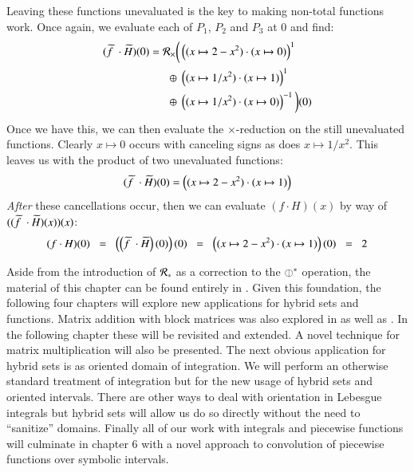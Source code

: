 Leaving these functions unevaluated is the key to making non-total functions work.
Once again, we evaluate each of $P_1$, $P_2$ and $P_3$ at 0 and find:
\begin{align*}
	(\pseudo{f\;} \cdot \,\pseudo{\!H})(0) = \mathcal{R}_\times \bigg(
				& \left( (x \mapsto 2-x^2) \cdot (x \mapsto 0) \right)^1 \notag \\
		\oplus \;& \left( (x \mapsto 1/x^2) \cdot (x \mapsto 1) \right)^1 \notag \\
		\oplus \;& \left( (x \mapsto 1/x^2) \cdot (x \mapsto 0) \right)^{-1} 
	\bigg)(0)
\end{align*}
Once we have this, we can then evaluate the $\times$-reduction on the still unevaluated functions.
Clearly $x \mapsto 0$ occurs with canceling signs as does $x \mapsto 1/x^2$.
This leaves us with the product of two unevaluated functions:
\begin{equation*}
	(\pseudo{f\;}\cdot\,\pseudo{\!H})(0) = \left((x \mapsto 2-x^2) \cdot (x \mapsto 1)\right)
\end{equation*}
\emph{After} these cancellations occur, then we can evaluate $(f \cdot H)(x)$ by way of
$((\pseudo{f\;}\cdot\,\pseudo{\!H})(x))(x)$:
\begin{align*}
	(f \cdot H)(0) 
		\;\;=\;\; \left(\left(\pseudo{f\;} \cdot \,\pseudo{\!H}\right)(0)\right)(0) 
		\;\;=\;\; \left((x \mapsto 2-x^2) \cdot (x \mapsto 1)\right)(0)
		\;\;=\;\; 2
\end{align*}


Aside from the introduction of $\R[\op]$ as a correction to the $\obar^\op$ operation, 
the material of this chapter can be found entirely in \cite{carette2010}.
Given this foundation, the following four chapters will explore new applications for hybrid sets and functions.
Matrix addition with block matrices was also explored in \cite{carette2010} as well as \cite{sexton2008abstract}.
In the following chapter these will be revisited and extended. 
A novel technique for matrix multiplication will also be presented.
The next obvious application for hybrid sets is as oriented domain of integration.
We will perform an otherwise standard treatment of integration but for the new usage of hybrid sets and oriented intervals.
There are other ways to deal with orientation in Lebesgue integrals but hybrid sets will allow us do so directly without 
the need to ``sanitize'' domains.
Finally all of our work with integrals and piecewise functions will culminate in chapter 6 with a novel approach to 
convolution of piecewise functions over symbolic intervals.






